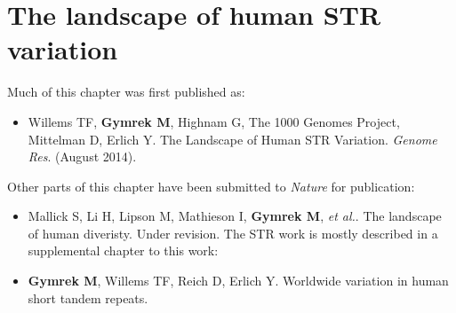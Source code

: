 \chapter{The landscape of human STR variation}

\hzline

Much of this chapter was first published as:

\begin{itemize}
\item[] Willems TF, \textbf{Gymrek M}, Highnam G, The 1000 Genomes Project, Mittelman D, Erlich Y. The
  Landscape of Human STR Variation. \emph{Genome Res}. (August 2014).
\end{itemize}

Other parts of this chapter have been submitted to \emph{Nature} for publication:
\begin{itemize}
\item[] Mallick S, Li H, Lipson M, Mathieson I, \textbf{Gymrek M}, \emph{et al.}. The landscape of human diveristy. Under revision. The STR work is mostly described in a supplemental chapter to this work:
\item[] \textbf{Gymrek M}, Willems TF, Reich D, Erlich Y. Worldwide variation in human short tandem repeats. 
\end{itemize}
\hzline
